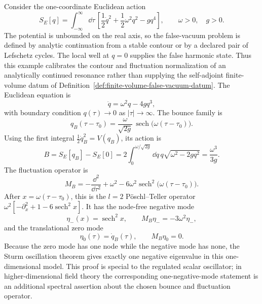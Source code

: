 \begin{example}
\label{ex:quartic-oscillator-false-vacuum-bounce}
Consider the one-coordinate Euclidean action
\begin{equation}
  S_E[q]
  =
  \int_{-\infty}^{\infty}\dd\tau\,
  \left[
    \frac12\dot q^2
    +
    \frac12\omega^2 q^2
    -
    g q^4
  \right],
  \qquad \omega>0,\quad g>0 .
  \label{eq:quartic-false-vacuum-euclidean-action}
\end{equation}
The potential is unbounded on the real axis, so the false-vacuum problem is
defined by analytic continuation from a stable contour or by a declared pair of
Lefschetz cycles.  The local well at \(q=0\) supplies the false harmonic
state.  Thus this example calibrates the contour and fluctuation normalization
of an analytically continued resonance rather than supplying the
self-adjoint finite-volume datum of
Definition~\ref{def:finite-volume-false-vacuum-datum}.  The Euclidean
equation is
\[
  \ddot q=\omega^2q-4gq^3,
\]
with boundary condition \(q(\tau)\to0\) as
\(|\tau|\to\infty\).  The bounce family is
\begin{equation}
  q_B(\tau-\tau_0)
  =
  \frac{\omega}{\sqrt{2g}}\,
  \operatorname{sech}\!\bigl(\omega(\tau-\tau_0)\bigr).
  \label{eq:quartic-false-vacuum-bounce-profile}
\end{equation}
Using the first integral
\(\frac12\dot q_B^2=V(q_B)\), its action is
\begin{equation}
  B
  =
  S_E[q_B]-S_E[0]
  =
  2\int_0^{\omega/\sqrt{2g}}\dd q\,
    q\sqrt{\omega^2-2gq^2}
  =
  \frac{\omega^3}{3g}.
  \label{eq:quartic-false-vacuum-bounce-action}
\end{equation}
The fluctuation operator is
\begin{equation}
  M_B
  =
  -\frac{\dd^2}{\dd\tau^2}
  +
  \omega^2
  -
  6\omega^2
  \operatorname{sech}^2\!\bigl(\omega(\tau-\tau_0)\bigr).
  \label{eq:quartic-false-vacuum-fluctuation-operator}
\end{equation}
After \(x=\omega(\tau-\tau_0)\), this is the \(l=2\) Pöschl--Teller operator
\(\omega^2[-\partial_x^2+1-6\operatorname{sech}^2x]\).  It has the
node-free negative mode
\[
  \eta_-(x)=\operatorname{sech}^2x,\qquad
  M_B\eta_-=-3\omega^2\eta_-,
\]
and the translational zero mode
\[
  \eta_0(\tau)=\dot q_B(\tau),\qquad M_B\eta_0=0 .
\]
Because the zero mode has one node while the negative mode has none, the
Sturm oscillation theorem gives exactly one negative eigenvalue in this
one-dimensional model.  This proof is special to the regulated scalar
oscillator; in higher-dimensional field theory the corresponding
one-negative-mode statement is an additional spectral assertion about the
chosen bounce and fluctuation operator.


\end{example}
